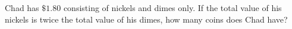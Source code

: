 Chad has $\$1.80$ consisting of nickels and dimes only. If the total value of his nickels is twice the total value of his dimes, how many coins does Chad have?
